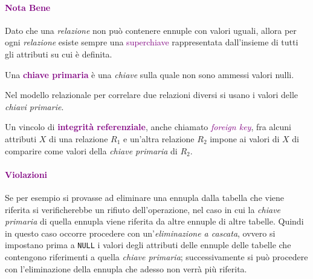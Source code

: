 \paragraph{\textcolor{purple}{Nota Bene}} Dato che una \emph{relazione} non può contenere ennuple
con valori uguali, allora per ogni \emph{relazione} esiste sempre una \textcolor{purple}{superchiave} rappresentata
dall'insieme di tutti gli attributi su cui è definita.

\begin{definition}
    Una \textbf{\textcolor{purple}{chiave primaria}} è una \emph{chiave} sulla quale non sono ammessi valori
    nulli.
\end{definition}

Nel modello relazionale per correlare due relazioni diversi si usano i valori delle \emph{chiavi primarie}.

\begin{definition}
    Un vincolo di \textbf{\textcolor{purple}{integrità referenziale}}, anche chiamato \emph{\textcolor{purple}{foreign key}},
    fra alcuni attributi $X$ di una relazione $R_1$ e un'altra relazione $R_2$ impone ai valori di $X$ di comparire come valori della
    \emph{chiave primaria} di $R_2$.
\end{definition}

\paragraph{\textcolor{purple}{Violazioni}} Se per esempio si provasse ad eliminare
una ennupla dalla tabella che viene riferita si verificherebbe un rifiuto dell'operazione, nel caso in cui
la \emph{chiave primaria} di quella ennupla viene riferita da altre ennuple di altre tabelle.
Quindi in questo caso occorre procedere con un'\emph{eliminazione a cascata}, ovvero si impostano prima
a \verb|NULL| i valori degli attributi delle ennuple delle tabelle che contengono riferimenti a quella \emph{chiave primaria};
successivamente si può procedere con l'eliminazione della ennupla che adesso non verrà più riferita.